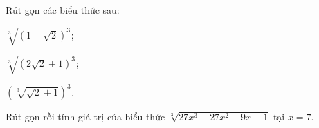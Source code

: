 \begin{exercises}
\begin{questions}[resume=SGK]
        \item Rút gọn các biểu thức sau:
        \begin{questions}
            \item $\sqrt[3]{(1-\sqrt{2})^3}$;
            \item $\sqrt[3]{(2\sqrt{2}+1)^3}$;
            \item $\left(\sqrt[3]{\sqrt{2}+1}\right)^3$.
        \end{questions}
        \answerline
        \answerline

        \item Rút gọn rồi tính giá trị của biểu thức $\sqrt[3]{27x^3-27x^2+9x-1}$ tại $x=7$.
        \answerline
        \answerline
    \end{questions}
\end{exercises}

